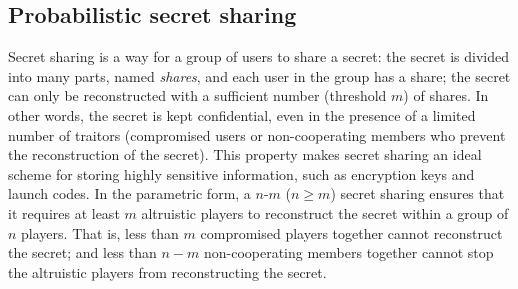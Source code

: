 

\subsection{Probabilistic secret sharing}
Secret sharing is a way for a group of users to share a secret: the secret is divided into many parts, named \emph{shares}, and each user in the group has a share; the secret can only be reconstructed with a sufficient number (threshold $m$) of shares. In other words, the secret is kept confidential, even in the presence of a limited number of traitors (compromised users or non-cooperating members who prevent the reconstruction of the secret). This property makes secret sharing an ideal scheme for storing highly sensitive information, such as encryption keys and launch codes. In the parametric form, a $n\mbox{-}m$ ($n\geq m$) secret sharing ensures that it requires at least $m$ altruistic players to reconstruct the secret within a group of $n$ players. That is, less than $m$ compromised players together cannot reconstruct the secret; and less than $n-m$ non-cooperating members together cannot stop the altruistic players from reconstructing the secret.

